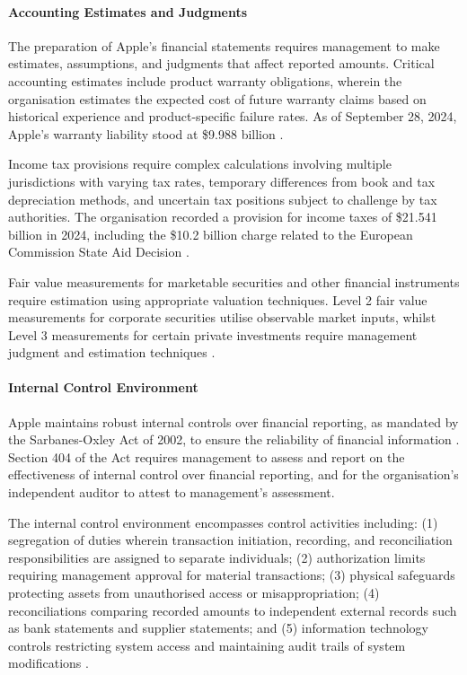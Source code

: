 \documentclass[12pt,a4paper]{article}
\begin{document}
\paragraph{Accounting Estimates and Judgments}

The preparation of Apple's financial statements requires management to make estimates, assumptions, and judgments that affect reported amounts. Critical accounting estimates include product warranty obligations, wherein the organisation estimates the expected cost of future warranty claims based on historical experience and product-specific failure rates. As of September 28, 2024, Apple's warranty liability stood at \$9.988 billion \citep{apple202410k}.

Income tax provisions require complex calculations involving multiple jurisdictions with varying tax rates, temporary differences from book and tax depreciation methods, and uncertain tax positions subject to challenge by tax authorities. The organisation recorded a provision for income taxes of \$21.541 billion in 2024, including the \$10.2 billion charge related to the European Commission State Aid Decision \citep{apple202410k}.

Fair value measurements for marketable securities and other financial instruments require estimation using appropriate valuation techniques. Level 2 fair value measurements for corporate securities utilise observable market inputs, whilst Level 3 measurements for certain private investments require management judgment and estimation techniques \citep{fasb2024}.

\paragraph{Internal Control Environment}

Apple maintains robust internal controls over financial reporting, as mandated by the Sarbanes-Oxley Act of 2002, to ensure the reliability of financial information \citep{sox2002}. Section 404 of the Act requires management to assess and report on the effectiveness of internal control over financial reporting, and for the organisation's independent auditor to attest to management's assessment.

The internal control environment encompasses control activities including: (1) segregation of duties wherein transaction initiation, recording, and reconciliation responsibilities are assigned to separate individuals; (2) authorization limits requiring management approval for material transactions; (3) physical safeguards protecting assets from unauthorised access or misappropriation; (4) reconciliations comparing recorded amounts to independent external records such as bank statements and supplier statements; and (5) information technology controls restricting system access and maintaining audit trails of system modifications \citep{kieso2023}.
\end{document}
